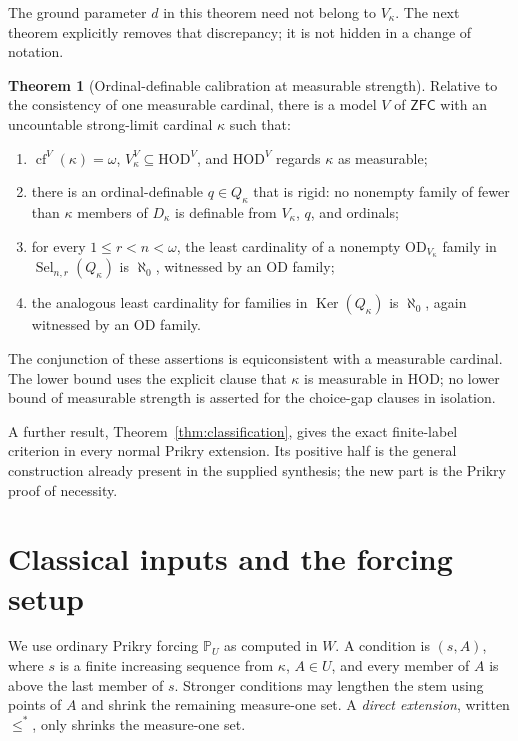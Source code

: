 \documentclass[11pt,letterpaper]{article}
\theoremstyle{definition}
\newtheorem{theorem}[definition]{Theorem}
\numberwithin{equation}{section}
\newcommand{\ZFC}{\mathsf{ZFC}}
\newcommand{\HOD}{\mathrm{HOD}}
\newcommand{\OD}{\mathrm{OD}}
\newcommand{\PP}{\mathbb P}
\newcommand{\Sel}{\operatorname{Sel}}
\newcommand{\Ker}{\operatorname{Ker}}
\newcommand{\cf}{\operatorname{cf}}
\begin{document}
The ground parameter $d$ in this theorem need not belong to $V_\kappa$. The next theorem explicitly removes that discrepancy; it is not hidden in a change of notation.

\begin{theorem}[Ordinal-definable calibration at measurable strength]\label{thm:coded-main}
Relative to the consistency of one measurable cardinal, there is a model $V$ of $\ZFC$ with an uncountable strong-limit cardinal $\kappa$ such that:
\begin{enumerate}
\item $\cf^V(\kappa)=\omega$, $V_\kappa^V\subseteq\HOD^V$, and $\HOD^V$ regards $\kappa$ as measurable;
\item there is an ordinal-definable $q\in Q_\kappa$ that is rigid: no nonempty family of fewer than $\kappa$ members of $D_\kappa$ is definable from $V_\kappa$, $q$, and ordinals;
\item for every $1\le r<n<\omega$, the least cardinality of a nonempty $\OD_{V_\kappa}$ family in $\Sel_{n,r}(Q_\kappa)$ is $\aleph_0$, witnessed by an $\OD$ family;
\item the analogous least cardinality for families in $\Ker(Q_\kappa)$ is $\aleph_0$, again witnessed by an $\OD$ family.
\end{enumerate}
The conjunction of these assertions is equiconsistent with a measurable cardinal. The lower bound uses the explicit clause that $\kappa$ is measurable in $\HOD$; no lower bound of measurable strength is asserted for the choice-gap clauses in isolation.
\end{theorem}

A further result, Theorem~\ref{thm:classification}, gives the exact finite-label criterion in every normal Prikry extension. Its positive half is the general construction already present in the supplied synthesis; the new part is the Prikry proof of necessity.

\section{Classical inputs and the forcing setup}\label{sec:inputs}

We use ordinary Prikry forcing $\PP_U$ as computed in $W$. A condition is $(s,A)$, where $s$ is a finite increasing sequence from $\kappa$, $A\in U$, and every member of $A$ is above the last member of $s$. Stronger conditions may lengthen the stem using points of $A$ and shrink the remaining measure-one set. A \emph{direct extension}, written $\leq^*$, only shrinks the measure-one set.
\end{document}
